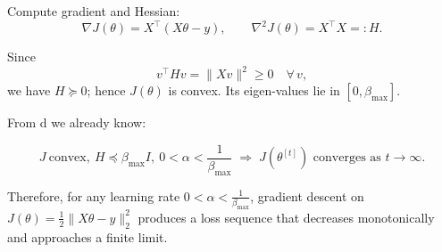 \begin{answer}
Compute gradient and Hessian:
\[
\nabla J(\theta)=X^{\top}(X\theta-y),\qquad 
\nabla^{2}J(\theta)=X^{\top}X=:H .
\]

Since
\[
v^{\top}Hv=\|Xv\|^{2}\ge0\quad\forall\,v,
\]
we have \(H\succeq0\); hence \(J(\theta)\) is convex.
Its eigen-values lie in \([0,\beta_{\max}]\).

From d we already know:

\[
\boxed{\;
J\ \text{convex},\ H\preceq\beta_{\max}I,\ 
0<\alpha<\frac{1}{\beta_{\max}}
\;\Longrightarrow\;
J(\theta^{[t]})\text{ converges as }t\to\infty.
\;}
\]

Therefore, for any learning rate
\(\displaystyle 0<\alpha<\frac{1}{\beta_{\max}}\),
gradient descent on 
\(J(\theta)=\tfrac12\lVert X\theta-y\rVert_2^{2}\)
produces a loss sequence that decreases monotonically
and approaches a finite limit.
\end{answer}
